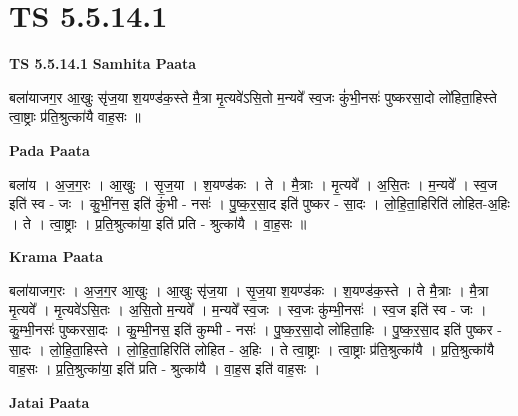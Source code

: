\documentclass[17pt]{extarticle}
\begin{document}
\section{ TS 5.5.14.1 }

\textbf{TS 5.5.14.1 } \newline
\textbf{Samhita Paata} \newline

बला॑याजग॒र आ॒खुः सृ॑ज॒या श॒यण्ड॑क॒स्ते मै॒त्रा मृ॒त्यवे॑ऽसि॒तो म॒न्यवे᳚ स्व॒जः कुं॑भी॒नसः॑ पुष्करसा॒दो लो॑हिता॒हिस्ते त्वा॒ष्ट्राः प्र॑ति॒श्रुत्का॑यै वाह॒सः ॥ \newline

\textbf{Pada Paata} \newline

बला॑य । अ॒ज॒ग॒रः । आ॒खुः । सृ॒ज॒या । श॒यण्ड॑कः । ते । मै॒त्राः । मृ॒त्यवे᳚ । अ॒सि॒तः । म॒न्यवे᳚ । स्व॒ज इति॑ स्व - जः । कु॒भीं॒नस॒ इति॑ कुंभी - नसः॑ । पु॒ष्क॒र॒सा॒द इति॑ पुष्कर - सा॒दः । लो॒हि॒ता॒हिरिति॑ लोहित-अ॒हिः । ते । त्वा॒ष्ट्राः । प्र॒ति॒श्रुत्का॑या॒ इति॑ प्रति - श्रुत्का॑यै । वा॒ह॒सः ॥  \newline


\textbf{Krama Paata} \newline

बला॑याजग॒रः । अ॒ज॒ग॒र आ॒खुः । आ॒खुः सृ॑ज॒या । सृ॒ज॒या श॒यण्ड॑कः । श॒यण्ड॑क॒स्ते । ते मै॒त्राः । मै॒त्रा मृ॒त्यवे᳚ । मृ॒त्यवे॑ऽसि॒तः । अ॒सि॒तो म॒न्यवे᳚ । म॒न्यवे᳚ स्व॒जः । स्व॒जः कु॑म्भी॒नसः॑ । स्व॒ज इति॑ स्व - जः । कु॒म्भी॒नसः॑ पुष्करसा॒दः । कु॒म्भी॒नस॒ इति॑ कुम्भी - नसः॑ । पु॒ष्क॒र॒सा॒दो लो॑हिता॒हिः । पु॒ष्क॒र॒सा॒द इति॑ पुष्कर - सा॒दः । लो॒हि॒ता॒हिस्ते । लो॒हि॒ता॒हिरिति॑ लोहित - अ॒हिः । ते त्वा॒ष्ट्राः । त्वा॒ष्ट्राः प्र॑ति॒श्रुत्का॑यै । प्र॒ति॒श्रुत्का॑यै वाह॒सः । प्र॒ति॒श्रुत्का॑या॒ इति॑ प्रति - श्रुत्का॑यै । वा॒ह॒स इति॑ वाह॒सः । \newline

\textbf{Jatai Paata} \newline
\end{document}
